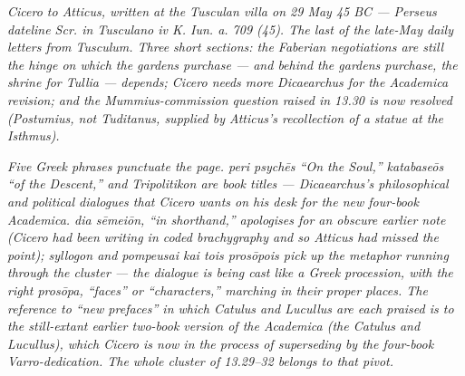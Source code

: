 
\textit{Cicero to Atticus, written at the Tusculan villa on 29 May
45 BC --- Perseus dateline \textit{Scr. in Tusculano iv K. Iun. a.
709 (45)}. The last of the late-May daily letters from Tusculum.
Three short sections: the Faberian negotiations are still the
hinge on which the gardens purchase --- and behind the gardens
purchase, the shrine for Tullia --- depends; Cicero needs more
Dicaearchus for the Academica revision; and the Mummius-commission
question raised in 13.30 is now resolved (Postumius, not
Tuditanus, supplied by Atticus's recollection of a statue at the
Isthmus).}

\textit{Five Greek phrases punctuate the page. \textit{peri psychēs}
``On the Soul,'' \textit{katabaseōs} ``of the \textit{Descent},''
and \textit{Tripolitikon} are book titles --- Dicaearchus's
philosophical and political dialogues that Cicero wants on his
desk for the new four-book Academica. \textit{dia sēmeiōn},
``in shorthand,'' apologises for an obscure earlier note (Cicero
had been writing in coded brachygraphy and so Atticus had missed
the point); \textit{syllogon} and \textit{pompeusai kai tois
prosōpois} pick up the metaphor running through the cluster ---
the dialogue is being cast like a Greek procession, with the right
\textit{prosōpa}, ``faces'' or ``characters,'' marching in their
proper places. The reference to ``new prefaces'' in which Catulus
and Lucullus are each praised is to the still-extant earlier
two-book version of the Academica (the \textit{Catulus} and
\textit{Lucullus}), which Cicero is now in the process of
superseding by the four-book Varro-dedication. The whole cluster
of 13.29--32 belongs to that pivot.}
